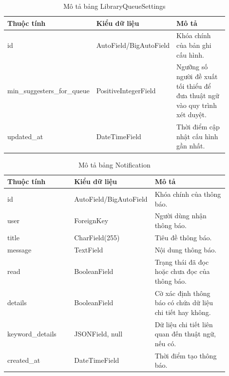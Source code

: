 ﻿\documentclass[../DoAn.tex]{subfiles}
\begin{document}
\begin{table}[H]
\centering
\caption{Mô tả bảng LibraryQueueSettings}
\label{table:db-library-queue-settings}
\small
\setlength{\tabcolsep}{4pt}
\renewcommand{\arraystretch}{1.18}
\begin{tabular}{|p{0.30\linewidth}|p{0.27\linewidth}|p{0.33\linewidth}|}
\hline
\textbf{Thuộc tính} & \textbf{Kiểu dữ liệu} & \textbf{Mô tả} \\ \hline
id & AutoField/BigAutoField & Khóa chính của bản ghi cấu hình. \\ \hline
min\_\allowbreak suggesters\_\allowbreak for\_\allowbreak queue & PositiveIntegerField & Ngưỡng số người đề xuất tối thiểu để đưa thuật ngữ vào quy trình xét duyệt. \\ \hline
updated\_\allowbreak at & DateTimeField & Thời điểm cập nhật cấu hình gần nhất. \\ \hline
\end{tabular}
\end{table}

\begin{table}[H]
\centering
\caption{Mô tả bảng Notification}
\label{table:db-notification}
\small
\setlength{\tabcolsep}{4pt}
\renewcommand{\arraystretch}{1.18}
\begin{tabular}{|p{0.30\linewidth}|p{0.27\linewidth}|p{0.33\linewidth}|}
\hline
\textbf{Thuộc tính} & \textbf{Kiểu dữ liệu} & \textbf{Mô tả} \\ \hline
id & AutoField/BigAutoField & Khóa chính của thông báo. \\ \hline
user & ForeignKey & Người dùng nhận thông báo. \\ \hline
title & CharField(255) & Tiêu đề thông báo. \\ \hline
message & TextField & Nội dung thông báo. \\ \hline
read & BooleanField & Trạng thái đã đọc hoặc chưa đọc của thông báo. \\ \hline
details & BooleanField & Cờ xác định thông báo có chứa dữ liệu chi tiết hay không. \\ \hline
keyword\_\allowbreak details & JSONField, null & Dữ liệu chi tiết liên quan đến thuật ngữ, nếu có. \\ \hline
created\_\allowbreak at & DateTimeField & Thời điểm tạo thông báo. \\ \hline
\end{tabular}
\end{table}
\end{document}

